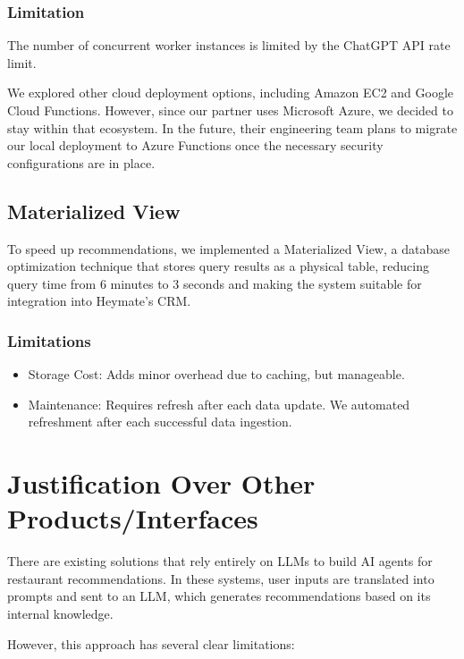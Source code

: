 \documentclass[
  11pt,
  a4paper,
  DIV=11,
  numbers=noendperiod]{scrartcl}
\providecommand{\tightlist}{%
  \setlength{\itemsep}{0pt}\setlength{\parskip}{0pt}}\usepackage{longtable,booktabs,array}
\begin{document}
\subsubsection{Limitation}\label{limitation-1}

The number of concurrent worker instances is limited by the ChatGPT API
rate limit.

We explored other cloud deployment options, including Amazon EC2 and
Google Cloud Functions. However, since our partner uses Microsoft Azure,
we decided to stay within that ecosystem. In the future, their
engineering team plans to migrate our local deployment to Azure
Functions once the necessary security configurations are in place.

\subsection{Materialized View}\label{materialized-view}

To speed up recommendations, we implemented a Materialized View, a
database optimization technique that stores query results as a physical
table, reducing query time from 6 minutes to 3 seconds and making the
system suitable for integration into Heymate's CRM.

\subsubsection{Limitations}\label{limitations}

\begin{itemize}
\tightlist
\item
  Storage Cost: Adds minor overhead due to caching, but manageable.
\item
  Maintenance: Requires refresh after each data update. We automated
  refreshment after each successful data ingestion.
\end{itemize}

\section{Justification Over Other
Products/Interfaces}\label{justification-over-other-productsinterfaces}

There are existing solutions that rely entirely on LLMs to build AI
agents for restaurant recommendations. In these systems, user inputs are
translated into prompts and sent to an LLM, which generates
recommendations based on its internal knowledge.

However, this approach has several clear limitations:
\end{document}
